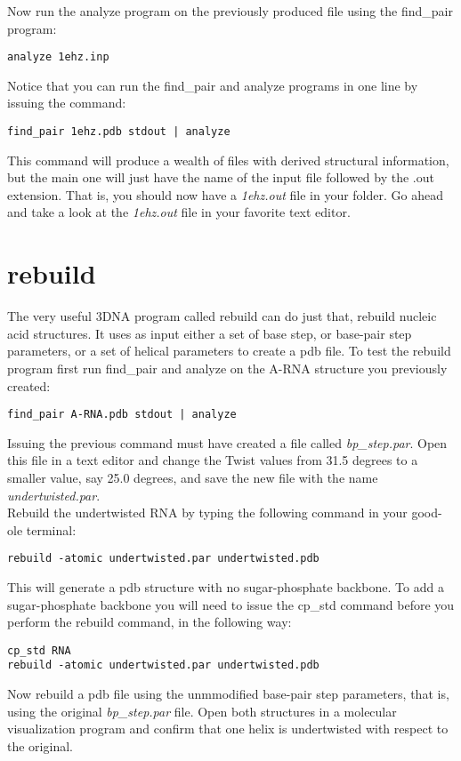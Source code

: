 \documentclass[10pt, oneside, pdftex]{article}
\begin{document}
\noindent Now run the analyze  program on the previously produced
file using the \textrm{find\_pair} program:
\begin{Verbatim}
analyze 1ehz.inp
\end{Verbatim}
Notice that  you can run the  \textrm{find\_pair} and \textrm{analyze}
programs in one line by issuing the command:
\begin{Verbatim}
find_pair 1ehz.pdb stdout | analyze
\end{Verbatim}
This command  will produce a  wealth of files with  derived structural
information, but  the main one  will just have  the name of  the input
file followed by  the .out extension.  That is, you  should now have a
\textit{1ehz.out} file in your folder. Go ahead and take a look at the
\textit{1ehz.out} file in your favorite text editor.

\section{rebuild}
The very useful 3DNA program called \textrm{rebuild} can do just that,
rebuild nucleic acid structures. It uses as input either a set of base
step, or base-pair step parameters,  or a set of helical parameters to
create  a   pdb  file.   To   test  the  rebuild  program   first  run
\textrm{find\_pair}  and \textrm{analyze} on  the A-RNA  structure you
previously created:
\begin{Verbatim}
find_pair A-RNA.pdb stdout | analyze
\end{Verbatim}
Issuing  the  previous  command  must   have  created  a  file  called
\textit{bp\_step.par}.
Open this file in a text editor  and change the Twist values from 31.5
degrees to  a smaller value, say  25.0 degrees, and save  the new file
with the name \textit{undertwisted.par}.\\
Rebuild the undertwisted  RNA by typing the following  command in your
good-ole terminal:
\begin{Verbatim}
rebuild -atomic undertwisted.par undertwisted.pdb
\end{Verbatim}
This   will  generate   a  pdb   structure  with   no  sugar-phosphate
backbone. To add a sugar-phosphate backbone you will need to issue the
\textrm{cp\_std}  command  before   you  perform  the  \textrm{rebuild}
command, in the following way:
\begin{Verbatim}
cp_std RNA
rebuild -atomic undertwisted.par undertwisted.pdb
\end{Verbatim} 
Now rebuild a  pdb file using the unmmodified base-pair
step  parameters, that  is, using  the  original \textit{bp\_step.par}
file. Open  both structures in  a molecular visualization  program and
confirm that one helix is undertwisted with respect to the original.
\end{document}
